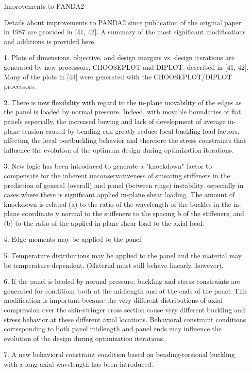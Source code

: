 Improvements to PANDA2

Details about improvements to PANDA2 since publication of the original
paper in 1987 are provided in [41, 42]. A summary of the most significant
modifications and additions is provided here. 

1. Plots of dimensions, objective, and design margins vs. design
iterations are generated by new processors, CHOOSEPLOT and DIPLOT,
described in [41, 42]. Many of the plots in [43] were generated
with the CHOOSEPLOT/DIPLOT processors. 

2. There is new flexibility with regard to the in-plane movability of the
edges as the panel is loaded by normal pressure. Indeed, with movable
boundaries of flat panels especially, the increased bowing and lack of
development of average in-plane tension caused by bending can greatly
reduce local buckling load factors, affecting the local postbuckling
behavior and therefore the stress constraints that influence the evolution
of the optimum design during optimization iterations. 

3. New logic has been introduced to generate a "knockdown" factor to
compensate for the inherent unconservativeness of smearing stiffeners in
the prediction of general (overall) and panel (between rings) instability,
especially in cases where there is significant applied in-plane shear
loading. The amount of knockdown is related (a) to the ratio of the
wavelength of the buckles in the in-plane coordinate y normal to the
stiffeners to the spacing b of the stiffeners, and (b) to the ratio of the
applied in-plane shear load to the axial load. 

4. Edge moments may be applied to the panel.

5. Temperature distributions may be applied to the panel and the material
may be temperature-dependent. (Material must still behave linearly,
however). 

6. If the panel is loaded by normal pressure, buckling and stress
constraints are generated for conditions both at the midlength and at the
ends of the panel.  This modification is important because the very
different distributions of axial compression over the skin-stringer cross
section cause very different buckling and stress behavior at these
different axial locations.  Behavioral constraint conditions corresponding
to both panel midlength and panel ends may influence the evolution of the
design during optimization iterations. 

7. A new behavioral constraint condition based on bending-torsional
buckling with a long axial wavelength has been introduced. 

